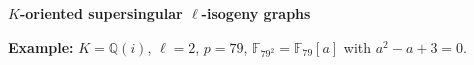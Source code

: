 \documentclass[10pt]{beamer}
\theoremstyle{plain}
\theoremstyle{definition}
\newcommand{\Q}{\mathbb{Q}}
\newcommand{\F}{\mathbb{F}}
\newcommand{\mO}{\mathcal{O}}
\renewcommand{\(}{\left(}
\renewcommand{\)}{\right)}
\begin{document}



\begin{frame}

\textbf{$K$-oriented supersingular $\ell$-isogeny graphs}

\vspace{0.5cm}

\textbf{Example:} $K=\Q(i)$, $\ell=2$, $p=79$,  $\F_{79^2}=\F_{79}[a]$ with $a^2-a+3=0$.

\begin{figure}[h!]
\centering


\end{figure}
\end{frame}
\end{document}
